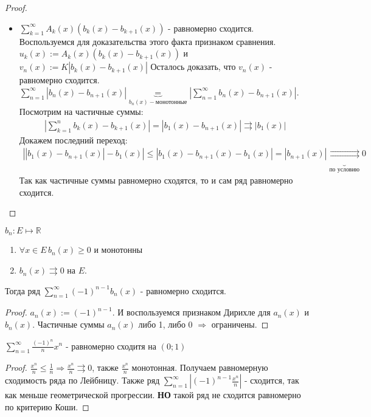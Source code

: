 \begin{theorem}
\begin{proof}
\begin{itemize}
    \item
      $\sum\limits_{k = 1}^{\infty}{A_k(x)(b_k(x) - b_{k+1}(x))}$ - равномерно сходится. Воспользуемся для доказательства этого факта признаком сравнения. \\
      $u_k(x) := A_k(x)(b_k(x) - b_{k+1}(x))$ и $v_n(x) := K|b_k(x) - b_{k+1}(x)|$
      Осталось доказать, что $v_n(x)$ - равномерно сходится.
      $\sum\limits_{n = 1}^{\infty}{\left|b_n(x) - b_{n+1}(x)\right|} \underbrace{=}_{b_n(x) - \text{монотонные}} \left|\sum\limits_{n=1}^{\infty}{b_n(x)-b_{n+1}(x)}\right|$.
      Посмотрим на частичные суммы:
        \[\begin{aligned}
          \left|\sum\limits_{k = 1}^{n}{b_k(x) - b_{k+1}(x)}\right| = \left|b_1(x) - b_{n+1}(x)\right| \rightrightarrows \left|b_1(x)\right|
        \end{aligned}\]
      Докажем последний переход:
      \[\begin{aligned}
        \left|\left|b_1(x) - b_{n+1}(x)\right| - b_1(x)\right| \leqslant \left|b_1(x) - b_{n+1}(x) - b_1(x)\right| = \left|b_{n+1}(x)\right| \underbrace{\rightrightarrows}_{\text{по условию}} 0
      \end{aligned}\]
      Так как частичные суммы равномерно сходятся, то и сам ряд равномерно сходится.
    \end{itemize}
  \end{proof}    
\end{theorem}

\begin{theorem} \thmslashn

$b_n : E\mapsto \mathbb{R}$
\begin{enumerate}
\item
  $\forall x \in E \, b_n(x) \geqslant 0$ и монотонны
\item
  $b_n(x) \rightrightarrows 0$ на $E$.
\end{enumerate}
Тогда ряд $\sum\limits_{n = 1}^{\infty}{(-1)^{n-1}b_n(x)}$ - равномерно сходится.
  \begin{proof} \thmslashn
    
    $a_n(x):= (-1)^{n-1}$. И воспользуемся признаком Дирихле для $a_n(x)$ и $b_n(x)$. Частичные суммы $a_n(x)$ либо 1, либо 0 $\Rightarrow$ ограничены.
  \end{proof}
\end{theorem}

\begin{example}

  $\sum\limits_{n=1}^{\infty}{\frac{(-1)^n}{n}x^n}$ - равномерно сходитя на $(0; 1)$
  \begin{proof} \thmslashn

    $\frac{x^n}{n} \leqslant \frac{1}{n} \Rightarrow \frac{x^n}{n} \rightrightarrows 0$, также $\frac{x^n}{n}$ монотонная. Получаем равномерную сходимость ряда по Лейбницу.
    Также ряд $\sum\limits_{n = 1}^{\infty}{|(-1)^{n-1}\frac{x^n}{n}|}$ - сходится, так как меньше геометрической прогрессии. \textbf{НО} такой ряд не сходится равномерно по критерию Коши.

  \end{proof}
\end{example}
